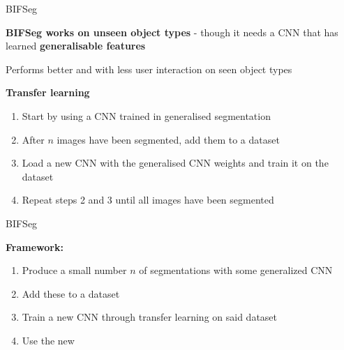 \documentclass[10pt]{beamer}
\begin{document}
\begin{frame}[fragile]{BIFSeg}

  \textbf{BIFSeg works on unseen object types} - though it
  needs a CNN that has learned \textbf{generalisable features}

  Performs better and with less user interaction on seen object types

  \pause
  \textbf{Transfer learning}
  \begin{enumerate}
  \item Start by using a CNN trained in generalised segmentation
  \item After $n$ images have been segmented, add them to a dataset
  \item Load a new CNN with the generalised CNN weights and train it on the dataset
  \item Repeat steps 2 and 3 until all images have been segmented
  \end{enumerate}

  
\end{frame}


\begin{frame}[fragile]{BIFSeg}
  
  \textbf{Framework:}
  \begin{enumerate}
  \item Produce a small number $n$ of segmentations with some generalized CNN
  \item Add these to a dataset
  \item Train a new CNN through transfer learning on said dataset
  \item Use the new 
  \end{enumerate}
  
\end{frame}




\end{document}
